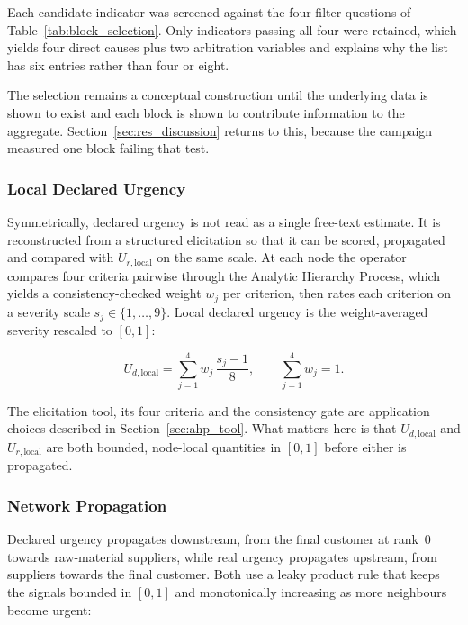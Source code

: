 Each candidate indicator was screened against the four filter questions of
Table~\ref{tab:block_selection}. Only indicators passing all four were retained, which yields
four direct causes plus two arbitration variables and explains why the list has six entries
rather than four or eight.

The selection remains a conceptual construction until the underlying data is shown to exist
and each block is shown to contribute information to the aggregate.
Section~\ref{sec:res_discussion} returns to this, because the campaign measured one block
failing that test.

\subsubsection{Local Declared Urgency}
\label{sec:model_ud}

Symmetrically, declared urgency is not read as a single free-text estimate. It is
reconstructed from a structured elicitation so that it can be scored, propagated and
compared with $U_{r,\text{local}}$ on the same scale. At each node the operator compares
four criteria pairwise through the Analytic Hierarchy Process, which yields a
consistency-checked weight $w_j$ per criterion, then rates each criterion on a severity
scale $s_j \in \{1, \ldots, 9\}$. Local declared urgency is the weight-averaged severity
rescaled to $[0,1]$:

\begin{equation}
    U_{d,\text{local}} = \sum_{j=1}^{4} w_j\,\frac{s_j - 1}{8}, \qquad \sum_{j=1}^{4} w_j = 1.
    \label{eq:ud_local}
\end{equation}

The elicitation tool, its four criteria and the consistency gate are application choices
described in Section~\ref{sec:ahp_tool}. What matters here is that $U_{d,\text{local}}$ and
$U_{r,\text{local}}$ are both bounded, node-local quantities in $[0,1]$ before either is
propagated.

\subsubsection{Network Propagation}
\label{sec:model_prop}

Declared urgency propagates downstream, from the final customer at rank~0 towards
raw-material suppliers, while real urgency propagates upstream, from suppliers towards the
final customer. Both use a leaky product rule that keeps the signals bounded in $[0,1]$ and
monotonically increasing as more neighbours become urgent:

